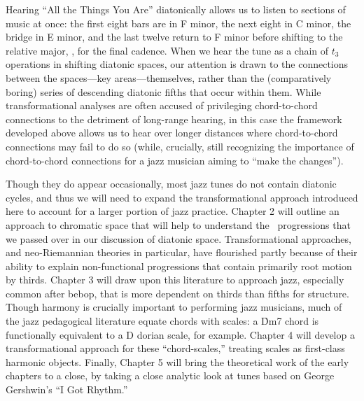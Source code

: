 \documentclass[diss]{subfiles}
\begin{document}
Hearing “All the Things You Are” diatonically allows us to listen to sections
of music at once: the first eight bars are in F minor, the next eight in C
minor, the bridge in E minor, and the last twelve return to F minor before
shifting to the relative major, \Aflat, for the final cadence. When we hear
the tune as a chain of $t_3$ operations in shifting diatonic spaces, our
attention is drawn to the connections between the spaces---key
areas---themselves, rather than the (comparatively boring) series of
descending diatonic fifths that occur within them.  While transformational
analyses are often accused of privileging chord-to-chord connections to the
detriment of long-range hearing, in this case the \gis{} framework developed
above allows us to hear over longer distances where chord-to-chord connections
may fail to do so (while, crucially, still recognizing the importance of
chord-to-chord connections for a jazz musician aiming to “make the changes”).



Though they do appear occasionally, most jazz tunes do not contain diatonic
cycles, and thus we will need to expand the transformational approach
introduced here to account for a larger portion of jazz practice. Chapter 2
will outline an approach to chromatic space that will help to understand the
\tfo\ progressions that we passed over in our discussion of diatonic space.
Transformational approaches, and neo-Riemannian theories in particular, have
flourished partly because of their ability to explain non-functional
progressions that contain primarily root motion by thirds. Chapter 3 will
draw upon this literature to approach jazz, especially common after
bebop, that is more dependent on thirds than fifths for structure. Though
harmony is crucially important to performing jazz musicians, much of the jazz
pedagogical literature equate chords with scales: a \h{Dm7} chord is
functionally equivalent to a D dorian scale, for example. Chapter 4 will
develop a transformational approach for these “chord-scales,” treating scales
as first-class harmonic objects. Finally, Chapter 5 will bring the theoretical
work of the early chapters to a close, by taking a close analytic look at
tunes based on George Gershwin’s “I Got Rhythm.”


\end{document}
